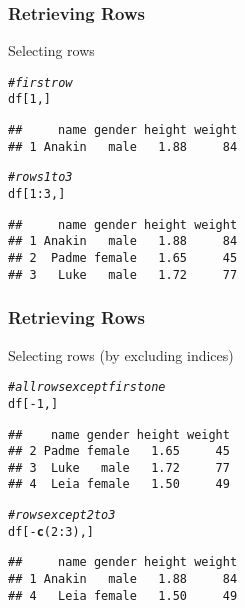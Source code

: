 \documentclass[12pt]{beamer}\usepackage[]{graphicx}\usepackage[]{color}
\makeatletter
\newcommand{\hlnum}[1]{\textcolor[rgb]{0.686,0.059,0.569}{#1}}%
\newcommand{\hlcom}[1]{\textcolor[rgb]{0.678,0.584,0.686}{\textit{#1}}}%
\newcommand{\hlopt}[1]{\textcolor[rgb]{0,0,0}{#1}}%
\newcommand{\hlstd}[1]{\textcolor[rgb]{0.345,0.345,0.345}{#1}}%
\newcommand{\hlkwd}[1]{\textcolor[rgb]{0.737,0.353,0.396}{\textbf{#1}}}%
\newenvironment{kframe}{%
 \def\at@end@of@kframe{}%
 \ifinner\ifhmode%
  \def\at@end@of@kframe{\end{minipage}}%
  \begin{minipage}{\columnwidth}%
 \fi\fi%
 \def\FrameCommand##1{\hskip\@totalleftmargin \hskip-\fboxsep
 \colorbox{shadecolor}{##1}\hskip-\fboxsep
     \hskip-\linewidth \hskip-\@totalleftmargin \hskip\columnwidth}%
 \MakeFramed {\advance\hsize-\width
   \@totalleftmargin\z@ \linewidth\hsize
   \@setminipage}}%
 {\par\unskip\endMakeFramed%
 \at@end@of@kframe}
\newenvironment{knitrout}{}{} %
\makeatother
\begin{document}
\begin{frame}[fragile]
\frametitle{Retrieving Rows}

Selecting rows
\begin{knitrout}\footnotesize
{}\color{fgcolor}\begin{kframe}
\begin{alltt}
\hlcom{# first row}
\hlstd{df[}\hlnum{1}\hlstd{, ]}
\end{alltt}
\begin{verbatim}
##     name gender height weight
## 1 Anakin   male   1.88     84
\end{verbatim}
\begin{alltt}
\hlcom{# rows 1 to 3}
\hlstd{df[}\hlnum{1}\hlopt{:}\hlnum{3}\hlstd{, ]}
\end{alltt}
\begin{verbatim}
##     name gender height weight
## 1 Anakin   male   1.88     84
## 2  Padme female   1.65     45
## 3   Luke   male   1.72     77
\end{verbatim}
\end{kframe}
\end{knitrout}

\end{frame}


\begin{frame}[fragile]
\frametitle{Retrieving Rows}

Selecting rows (by excluding indices)
\begin{knitrout}\footnotesize
{}\color{fgcolor}\begin{kframe}
\begin{alltt}
\hlcom{# all rows except first one}
\hlstd{df[}\hlopt{-}\hlnum{1}\hlstd{, ]}
\end{alltt}
\begin{verbatim}
##    name gender height weight
## 2 Padme female   1.65     45
## 3  Luke   male   1.72     77
## 4  Leia female   1.50     49
\end{verbatim}
\begin{alltt}
\hlcom{# rows except 2 to 3}
\hlstd{df[}\hlopt{-}\hlkwd{c}\hlstd{(}\hlnum{2}\hlopt{:}\hlnum{3}\hlstd{), ]}
\end{alltt}
\begin{verbatim}
##     name gender height weight
## 1 Anakin   male   1.88     84
## 4   Leia female   1.50     49
\end{verbatim}
\end{kframe}
\end{knitrout}

\end{frame}
\end{document}
